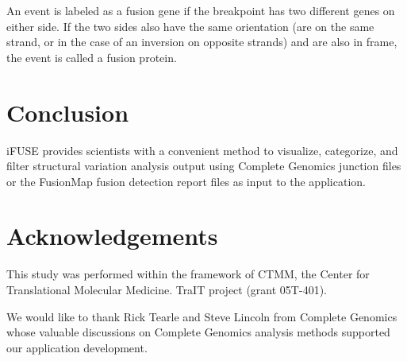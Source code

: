 An event is labeled as a fusion gene if the breakpoint has two different genes on either side. If the two sides also have the same orientation (are on the same strand, or in the case of an inversion on opposite strands) and are also in frame, the event is called a fusion protein.

\section*{Conclusion}

iFUSE provides scientists with a convenient method to visualize, categorize, and filter structural variation analysis output using Complete Genomics junction files or the FusionMap fusion detection report files as input to the application.

\section*{Acknowledgements}

This study was performed within the framework of CTMM, the Center for Translational Molecular Medicine. TraIT project (grant 05T-401).

We would like to thank Rick Tearle and Steve Lincoln from Complete Genomics whose valuable discussions on Complete Genomics analysis methods supported our application development.


